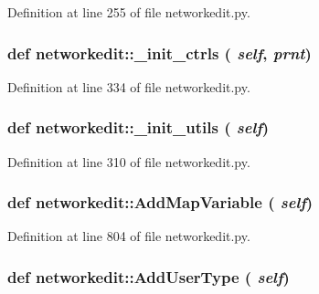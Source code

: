 Definition at line 255 of file networkedit.py.\hypertarget{namespacenetworkedit_fe1c1ffc78b7a7416942b40633884018}{
\subsubsection[\_\-init\_\-ctrls]{\setlength{\rightskip}{0pt plus 5cm}def networkedit::\_\-init\_\-ctrls ( {\em self},  {\em prnt})}}
\label{namespacenetworkedit_fe1c1ffc78b7a7416942b40633884018}




Definition at line 334 of file networkedit.py.\hypertarget{namespacenetworkedit_a1cd2a66c69c00d34dffdb3e53101fcd}{
\subsubsection[\_\-init\_\-utils]{\setlength{\rightskip}{0pt plus 5cm}def networkedit::\_\-init\_\-utils ( {\em self})}}
\label{namespacenetworkedit_a1cd2a66c69c00d34dffdb3e53101fcd}




Definition at line 310 of file networkedit.py.\hypertarget{namespacenetworkedit_3b5726dbbad16c70542eb1a795e98dfb}{
\subsubsection[AddMapVariable]{\setlength{\rightskip}{0pt plus 5cm}def networkedit::Add\-Map\-Variable ( {\em self})}}
\label{namespacenetworkedit_3b5726dbbad16c70542eb1a795e98dfb}




Definition at line 804 of file networkedit.py.\hypertarget{namespacenetworkedit_29fd99e799c36ab2f01061e1752c89c9}{
\subsubsection[AddUserType]{\setlength{\rightskip}{0pt plus 5cm}def networkedit::Add\-User\-Type ( {\em self})}}
\label{namespacenetworkedit_29fd99e799c36ab2f01061e1752c89c9}




